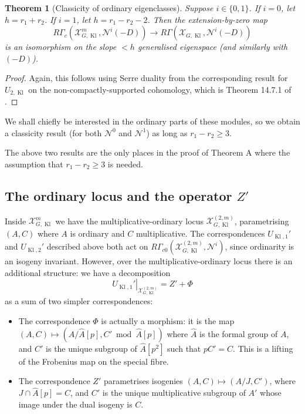 \documentclass[cjm]{ipart}
\theoremstyle{plain}
\newtheorem{theorem}{Theorem}[subsection]
\theoremstyle{remark}
\DeclareMathOperator{\Kl}{Kl}
\newcommand{\cN}{\mathcal{N}}
\newcommand{\cX}{\mathcal{X}}
\numberwithin{equation}{subsection}
\renewcommand{\ge}{\geqslant}
\begin{document}
  \begin{theorem}[Classicity of ordinary eigenclasses]
   \label{thm:classicity}
   Suppose $i \in \{0, 1\}$. If $i = 0$, let $h = r_1 + r_2$. If $i = 1$, let $h = r_1 - r_2 - 2$. Then the extension-by-zero map
   \[ R\Gamma_c\left(\cX_{G,\Kl}^m, \cN^i(-D)\right) \longrightarrow R\Gamma\left(\cX_{G,\Kl}, \cN^i(-D)\right) \]
   is an isomorphism on the slope $< h$ generalised eigenspace (and similarly with $(-D)$).
  \end{theorem}
  
  \begin{proof}
   Again, this follows using Serre duality from the corresponding result for $U_{2, \Kl}$ on the non-compactly-supported cohomology, which is Theorem 14.7.1 of \cite{pilloni20}.
  \end{proof}
  
  We shall chiefly be interested in the ordinary parts of these modules, so we obtain a classicity result (for both $\cN^0$ and $\cN^1$) as long as $r_1 - r_2 \ge 3$.
  
  \begin{remark}
   The above two results are the only places in the proof of Theorem A where the assumption that $r_1 - r_2 \ge 3$ is needed.
  \end{remark}

 \subsection{The ordinary locus and the operator $Z'$}\label{ss:newHeckeop}

  Inside $\cX_{G,\Kl}^m$ we have the multiplicative-ordinary locus $\cX_{G,\Kl}^{(2,m)}$, parametrising $(A, C)$ where $A$ is ordinary and $C$ multiplicative. The correspondences $U_{\Kl, 1}'$ and $U_{\Kl, 2}'$ described above both act on $R\Gamma_{c0}(\cX_{G,\Kl}^{(2, m)}, \cN^i)$, since ordinarity is an isogeny invariant. However, over the multiplicative-ordinary locus there is an additional structure: we have a decomposition
  \[ \left. U_{\Kl, 1}' \right|_{\cX_{G,\Kl}^{(2,m)}} = Z' + \Phi \]
  as a sum of two simpler correspondences:
  \begin{itemize}
   \item The correspondence $\Phi$ is actually a morphism: it is the map $(A, C) \mapsto (A / \hat{A}[p], C' \bmod \hat{A}[p])$ where $\hat{A}$ is the formal group of $A$, and $C'$ is the unique subgroup of $\hat{A}[p^2]$ such that $pC' = C$. This is a lifting of the Frobenius map on the special fibre.
   \item The correspondence $Z'$ parametrises isogenies $(A, C) \mapsto (A/J, C')$, where $J \cap \hat{A}[p] = C$, and $C'$ is the unique multiplicative subgroup of $A'$ whose image under the dual isogeny is $C$.
  \end{itemize}
\end{document}
